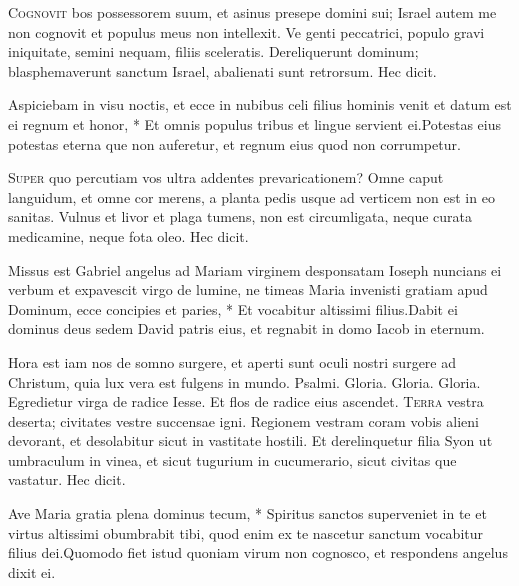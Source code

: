 \begin{multicols*}{2}
\lettrine[lines=2]{\zallmancaps \color{Red} C}{ognovit} bos possessorem suum, et asinus presepe domini sui; Israel autem me non cognovit et populus meus non intellexit. Ve genti peccatrici, populo gravi iniquitate, semini nequam, filiis sceleratis. Dereliquerunt dominum; blasphemaverunt sanctum Israel, abalienati sunt retrorsum. Hec dicit.
\begin{responsory}[aspiciebam]
{Aspiciebam in visu noctis, et ecce in nubibus celi filius hominis venit et datum est ei regnum et honor, * Et omnis populus tribus et lingue servient ei.}{Potestas eius potestas eterna que non auferetur, et regnum eius quod non corrumpetur.}
\end{responsory}
\lettrine[lines=2]{\zallmancaps \color{Blue} S}{uper} quo percutiam vos ultra addentes prevaricationem? Omne caput languidum, et omne cor merens, a planta pedis usque ad verticem non est in eo sanitas. Vulnus et livor et plaga tumens, non est circumligata, neque curata medicamine, neque fota oleo. Hec dicit.
\begin{responsory-doxology}
{Missus est Gabriel angelus ad Mariam virginem desponsatam Ioseph nuncians ei verbum et expavescit virgo de lumine, ne timeas Maria invenisti gratiam apud Dominum, ecce concipies et paries, * Et vocabitur altissimi filius.}{Dabit ei dominus deus sedem David patris eius, et regnabit in domo Iacob in eternum.}
\end{responsory-doxology}
 Hora est iam nos de somno surgere, et aperti sunt oculi nostri surgere ad Christum, quia lux vera est fulgens in mundo. {\color{Red} Psalmi.}
 Gloria.
 Gloria.
 Gloria. \V Egredietur virga de radice Iesse. \R Et flos de radice eius ascendet.
\lettrine[lines=2]{\zallmancaps \color{Red} T}{erra} vestra deserta; civitates vestre succensae igni. Regionem vestram coram vobis alieni
devorant, et desolabitur sicut in vastitate hostili. Et derelinquetur filia Syon ut umbraculum in vinea, et sicut tugurium in cucumerario, sicut civitas que vastatur. Hec dicit.
\begin{responsory}
{Ave Maria gratia plena dominus tecum, * Spiritus sanctos superveniet in te et virtus altissimi obumbrabit tibi, quod enim ex te nascetur sanctum vocabitur filius dei.}{Quomodo fiet istud quoniam virum non cognosco, et respondens angelus dixit ei.}

\end{responsory}
\end{multicols*}
